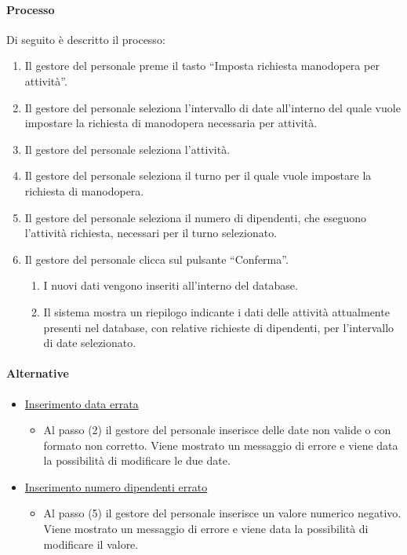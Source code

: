 \paragraph{Processo}
Di seguito è descritto il processo:
\begin{enumerate}
	\item Il gestore del personale preme il tasto “Imposta richiesta manodopera per attività”.
	\item Il gestore del personale seleziona l’intervallo di date all’interno del quale vuole impostare la richiesta di manodopera necessaria per attività. 
	\item Il gestore del personale seleziona l'attività.
	\item Il gestore del personale seleziona il turno per il quale vuole impostare la richiesta di manodopera.
	\item Il gestore del personale seleziona il numero di dipendenti, che eseguono l'attività richiesta, necessari per il turno selezionato.
	\item Il gestore del personale clicca sul pulsante “Conferma”.
		\begin{enumerate}
			\item I nuovi dati vengono inseriti all’interno del database.
			\item Il sistema mostra un riepilogo indicante i dati delle attività attualmente presenti nel database, con relative richieste di dipendenti, per l’intervallo di date selezionato.
		\end{enumerate}
\end{enumerate}
\paragraph{Alternative}
\begin{itemize}
	\item \underline{Inserimento data errata}
		\begin{itemize}
			\item Al passo (2) il gestore del personale inserisce delle date non valide o con formato non corretto. Viene mostrato un messaggio di errore e viene data la possibilità di modificare le due date.
		\end{itemize}
	\item \underline{Inserimento numero dipendenti errato}
		\begin{itemize}
			\item Al passo (5) il gestore del personale inserisce un valore numerico negativo. Viene mostrato un messaggio di errore e viene data la possibilità di modificare il valore.
		\end{itemize}
\end{itemize}